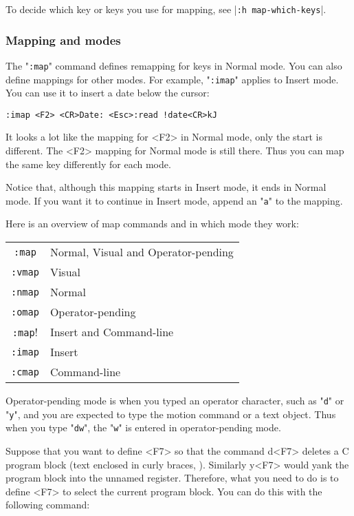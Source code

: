 To decide which key or keys you use for mapping, see |\verb!:h map-which-keys!|.

\subsubsection{Mapping and modes}
The "\verb!:map!" command defines remapping for keys in Normal mode.
You can also define mappings for other modes.
For example, "\verb!:imap!" applies to Insert mode.
You can use it to insert a date below the cursor:

\begin{Verbatim}[samepage=true]
 :imap <F2> <CR>Date: <Esc>:read !date<CR>kJ
\end{Verbatim}

It looks a lot like the mapping for <F2> in Normal mode, only the start is different.
The <F2> mapping for Normal mode is still there.
Thus you can map the same key differently for each mode.

Notice that, although this mapping starts in Insert mode, it ends in Normal mode.
If you want it to continue in Insert mode, append an "\verb!a!" to the mapping.

Here is an overview of map commands and in which mode they work:
\begin{center} \begin{tabular}{c l}
				\verb!:map! & Normal, Visual and Operator-pending \\
				\verb!:vmap! & Visual \\
				\verb!:nmap! & Normal \\
				\verb!:omap! & Operator-pending \\
				\verb!:map!! & Insert and Command-line \\
				\verb!:imap! & Insert \\
				\verb!:cmap! & Command-line \\
\end{tabular} \end{center}

Operator-pending mode is when you typed an operator character, such as "\verb!d!" or "\verb!y!", and you are expected to type the motion command or a text object.
Thus when you type "\verb!dw!", the "\verb!w!" is entered in operator-pending mode.

Suppose that you want to define <F7> so that the command d<F7> deletes a C program block (text enclosed in curly braces, {}).
Similarly y<F7> would yank the program block into the unnamed register.
Therefore, what you need to do is to define <F7> to select the current program block.
You can do this with the following command:

